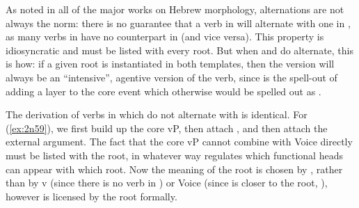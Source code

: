 \begin{exe}
\begin{xlist}
\begin{exe}
\begin{xlist}
\begin{exe}
\begin{xlist}
\begin{exe}
\begin{exe}
\begin{xlist}
\begin{exe}
\begin{xlist}
\begin{exe}
\begin{xlist}
\begin{exe}
\begin{xlist}
\begin{exe}
\begin{xlist}
\begin{exe}
\begin{xlist}
\begin{exe}
\begin{xlist}
\begin{exe}
\begin{xlist}
\begin{exe}
\begin{xlist}
\begin{exe}
\begin{xlist}
\begin{exe}
\begin{xlist}
\begin{exe}
\begin{xlist}
\begin{exe}
\begin{exe}
\begin{xlist}
\begin{exe}
\begin{xlist}
\begin{exe}
\begin{xlist}
\begin{exe}
\begin{xlist}
{\begin{exe}
\begin{xlist}
\begin{exe}
\begin{xlist}
\begin{exe}
\begin{xlist}
\begin{exe}
\begin{xlist}
\begin{xlist}
\begin{xlist}
\begin{exe}
\begin{xlist}
\begin{xlist}
\begin{xlist}
\begin{exe}
\begin{exe}
\begin{xlist}
\begin{exe}
\begin{xlist}
\begin{exe}
\begin{xlist}
\begin{exe}
\begin{xlist}
\begin{exe}
\begin{xlist}
\begin{exe}
\begin{xlist}
\begin{exe}
\begin{exe}
\begin{xlist}
\begin{xlist}
\begin{exe}
\begin{xlist}
\begin{exe}
\begin{xlist}
\begin{exe}
\begin{xlist}
\begin{exe}
\begin{xlist}
\begin{exe}
\begin{xlist}
\begin{exe}
\begin{xlist}
\begin{exe}
\begin{exe}
\begin{xlist}
As noted in all of the major works on Hebrew morphology, alternations are not always the norm: there is no guarantee that a verb in {\tkal} will alternate with one in {\tpie}, as many verbs in {\tkal} have no counterpart in {\tpie} (and vice versa). This property is idiosyncratic and must be listed with every root. But when {\tkal} and {\tpie} do alternate, this is how: if a given root is instantiated in both templates, then the {\tpie} version will always be an ``intensive'', agentive version of the {\tkal} verb, since {\tpie} is the spell-out of adding a {\va} layer to the core event which otherwise would be spelled out as {\tkal}. 

The derivation of verbs in {\tpie} which do not alternate with {\tkal} is identical. For (\ref{ex:2n59}), we first build up the core vP, then attach {\va}, and then attach the external argument. The fact that the core vP cannot combine with Voice directly must be listed with the root, in whatever way regulates which functional heads can appear with which root. Now the meaning of the root is chosen by {\va}, rather than by v (since there is no verb in {\tkal}) or Voice (since {\va} is closer to the root, \citealt{arad03,marantz13,elenasamioti14}), however {\va} is licensed by the root formally.

\end{xlist}
\end{exe}
\end{exe}
\end{xlist}
\end{exe}
\end{xlist}
\end{exe}
\end{xlist}
\end{exe}
\end{xlist}
\end{exe}
\end{xlist}
\end{exe}
\end{xlist}
\end{exe}
\end{xlist}
\end{xlist}
\end{exe}
\end{exe}
\end{xlist}
\end{exe}
\end{xlist}
\end{exe}
\end{xlist}
\end{exe}
\end{xlist}
\end{exe}
\end{xlist}
\end{exe}
\end{xlist}
\end{exe}
\end{exe}
\end{xlist}
\end{xlist}
\end{xlist}
\end{exe}
\end{xlist}
\end{xlist}
\end{xlist}
\end{exe}
\end{xlist}
\end{exe}
\end{xlist}
\end{exe}
\end{xlist}
\end{exe}}
\end{xlist}
\end{exe}
\end{xlist}
\end{exe}
\end{xlist}
\end{exe}
\end{xlist}
\end{exe}
\end{exe}
\end{xlist}
\end{exe}
\end{xlist}
\end{exe}
\end{xlist}
\end{exe}
\end{xlist}
\end{exe}
\end{xlist}
\end{exe}
\end{xlist}
\end{exe}
\end{xlist}
\end{exe}
\end{xlist}
\end{exe}
\end{xlist}
\end{exe}
\end{xlist}
\end{exe}
\end{xlist}
\end{exe}
\end{xlist}
\end{exe}
\end{exe}
\end{xlist}
\end{exe}
\end{xlist}
\end{exe}
\end{xlist}
\end{exe}
